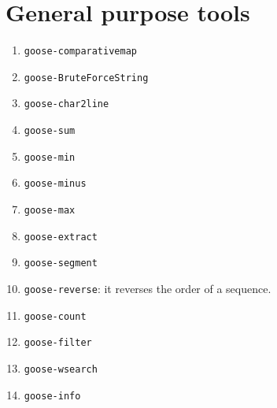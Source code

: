 \chapter{General purpose tools}
\label{seq}

\begin{enumerate}
\item \texttt{goose-comparativemap}%
\item \texttt{goose-BruteForceString}%
\item \texttt{goose-char2line}%
\item \texttt{goose-sum}%
\item \texttt{goose-min}%
\item \texttt{goose-minus}%
\item \texttt{goose-max}%
\item \texttt{goose-extract}%
\item \texttt{goose-segment}%
\item \texttt{goose-reverse}: it reverses the order of a sequence.
\item \texttt{goose-count}
\item \texttt{goose-filter}
\item \texttt{goose-wsearch}
\item \texttt{goose-info}
\end{enumerate}

%
%
%
%
%
%
%
%
%

%
%
%
%